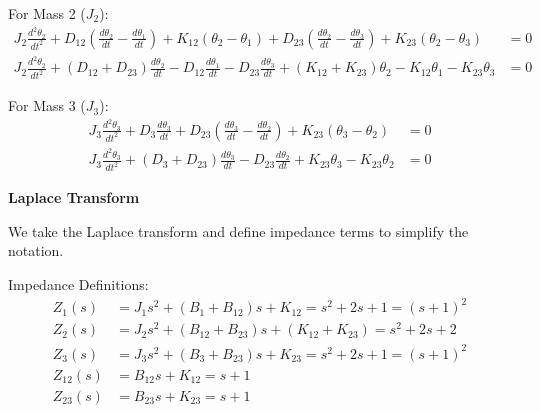 \documentclass[11pt]{article}
\begin{document}
{For Mass 2 ($J_2$):}
\begin{align*}
J_2\frac{d^2\theta_2}{dt^2}
+ D_{12}\!\left(\frac{d\theta_2}{dt}-\frac{d\theta_1}{dt}\right)
+ K_{12}\!\left(\theta_2-\theta_1\right)
+ D_{23}\!\left(\frac{d\theta_2}{dt}-\frac{d\theta_3}{dt}\right)
+ K_{23}\!\left(\theta_2-\theta_3\right) &= 0 \\[4pt]
J_2\frac{d^2\theta_2}{dt^2}
+ (D_{12}+D_{23})\frac{d\theta_2}{dt}
- D_{12}\frac{d\theta_1}{dt}
- D_{23}\frac{d\theta_3}{dt}
+ (K_{12}+K_{23})\theta_2
- K_{12}\theta_1
- K_{23}\theta_3 &= 0
\end{align*}

\begin{figure}[h!]
  \centering
  \hspace*{-20mm}
\end{figure}

{For Mass 3 ($J_3$):}
\begin{align*}
J_3\frac{d^2\theta_3}{dt^2}
+ D_3\frac{d\theta_3}{dt}
+ D_{23}\!\left(\frac{d\theta_3}{dt}-\frac{d\theta_2}{dt}\right)
+ K_{23}\!\left(\theta_3-\theta_2\right) &= 0 \\[4pt]
J_3\frac{d^2\theta_3}{dt^2}
+ (D_3+D_{23})\frac{d\theta_3}{dt}
- D_{23}\frac{d\theta_2}{dt}
+ K_{23}\theta_3
- K_{23}\theta_2 &= 0
\end{align*}


\noindent\textbf{Laplace Transform}
\vspace{8pt}

\noindent We take the Laplace transform and define impedance terms to simplify the notation.

\vspace{5pt}
{Impedance Definitions:}
\begin{align*}
    Z_1(s) &= J_1s^2 + (B_1+B_{12})s + K_{12} = s^2 + 2s + 1 = (s+1)^2 \\
    Z_2(s) &= J_2s^2 + (B_{12}+B_{23})s + (K_{12}+K_{23}) = s^2 + 2s + 2 \\
    Z_3(s) &= J_3s^2 + (B_3+B_{23})s + K_{23} = s^2 + 2s + 1 = (s+1)^2 \\
    Z_{12}(s) &= B_{12}s + K_{12} = s+1 \\
    Z_{23}(s) &= B_{23}s + K_{23} = s+1
\end{align*}
\end{document}
